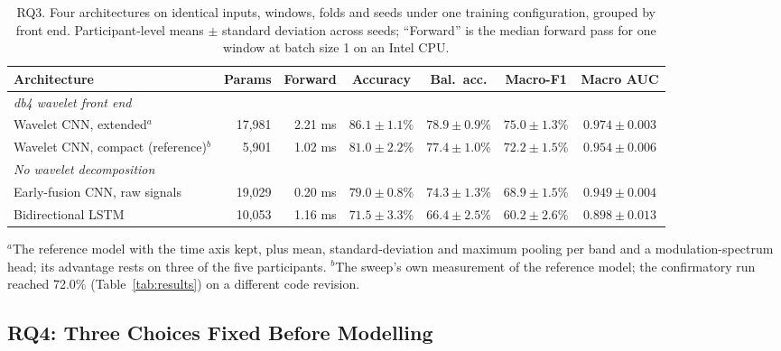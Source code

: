 \documentclass[journal]{IEEEtran}
\begin{document}
\begin{table}[!t]
  \centering
  \caption{RQ3. Four architectures on identical inputs, windows, folds and seeds under one training configuration, grouped by front end. Participant-level means $\pm$ standard deviation across seeds; ``Forward'' is the median forward pass for one window at batch size 1 on an Intel CPU.}
  \label{tab:architectures}
  \footnotesize
  \begin{tabular*}{\textwidth}{@{\extracolsep{\fill}}lrrcccc@{}}
    \toprule
    Architecture & Params & Forward & Accuracy & Bal.\ acc. & Macro-F1 & Macro AUC \\
    \midrule
    \multicolumn{7}{l}{\emph{db4 wavelet front end}}\\
    Wavelet CNN, extended$^{a}$ & 17,981 & 2.21 ms & $\mathbf{86.1 \pm 1.1}$\% & $\mathbf{78.9 \pm 0.9}$\% & $\mathbf{75.0 \pm 1.3}$\% & $\mathbf{0.974 \pm 0.003}$ \\
    Wavelet CNN, compact (reference)$^{b}$ & 5,901 & 1.02 ms & $81.0 \pm 2.2$\% & $77.4 \pm 1.0$\% & $72.2 \pm 1.5$\% & $0.954 \pm 0.006$ \\
    \midrule
    \multicolumn{7}{l}{\emph{No wavelet decomposition}}\\
    Early-fusion CNN, raw signals & 19,029 & 0.20 ms & $79.0 \pm 0.8$\% & $74.3 \pm 1.3$\% & $68.9 \pm 1.5$\% & $0.949 \pm 0.004$ \\
    Bidirectional LSTM & 10,053 & 1.16 ms & $71.5 \pm 3.3$\% & $66.4 \pm 2.5$\% & $60.2 \pm 2.6$\% & $0.898 \pm 0.013$ \\
    \bottomrule
  \end{tabular*}
  \begin{flushleft}\footnotesize
  $^{a}$The reference model with the time axis kept, plus mean, standard-deviation and maximum pooling per band and a modulation-spectrum head; its advantage rests on three of the five participants.
  $^{b}$The sweep's own measurement of the reference model; the confirmatory run reached 72.0\% (Table~\ref{tab:results}) on a different code revision.
  \end{flushleft}
\end{table}

\subsection{RQ4: Three Choices Fixed Before Modelling}
\label{sec:rq4}
\end{document}
